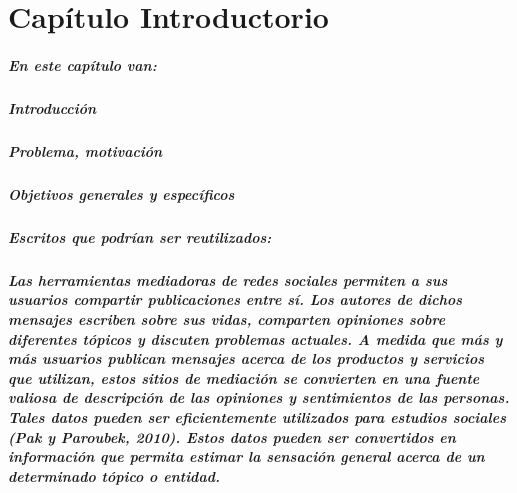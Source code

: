 \chapter {Cap\'itulo Introductorio}\label{Introduccion}

\paragraph{En este cap\'itulo van:}

\paragraph{Introducci\'on}
\paragraph{Problema, motivaci\'on}
\paragraph{Objetivos generales y espec\'ificos}

\paragraph{Escritos que podr\'ian ser reutilizados:}

\paragraph{\textit{Las herramientas mediadoras de redes sociales permiten a sus usuarios compartir publicaciones entre s\'i. Los autores de dichos mensajes escriben sobre sus vidas, comparten opiniones sobre diferentes t\'opicos y discuten problemas actuales. A medida que m\'as y m\'as usuarios publican mensajes acerca de los productos y servicios que utilizan, estos sitios de mediaci\'on se convierten en una fuente valiosa de descripci\'on de las opiniones y sentimientos de las personas. Tales datos pueden ser eficientemente utilizados para estudios sociales (Pak y Paroubek, 2010). Estos datos pueden ser convertidos en informaci\'on que permita estimar la sensaci\'on general acerca de un determinado t\'opico o entidad.}}

